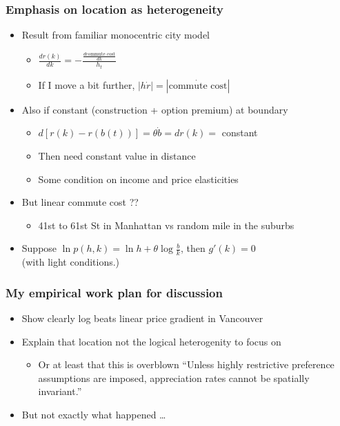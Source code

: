\documentclass{beamer}
\begin{document}
\begin{frame}
	\frametitle{Emphasis on location as heterogeneity}
	\begin{itemize}
		\item Result from familiar monocentric city model 
			\begin{itemize}
				\item $\frac{d r(k)}{dk} = -\frac{\frac{d\text{commute cost}}{dk}}{h_{t}}$
				\item If I move a bit further, $|h\dot{r}| = |\dot{\text{commute cost}}|$
			\end{itemize}
		\item Also if constant (construction + option premium) at boundary
			\begin{itemize}
				\item $d\left[r(k)-r(b(t))\right] = \theta \dot{b} = dr(k)=$ constant
				\item Then need constant value in distance
				\item Some condition on income and price elasticities
			\end{itemize}
		\item But linear commute cost ??
			\begin{itemize}
				\item 41st to 61st St in Manhattan vs random mile in the suburbs
			\end{itemize}
		\item Suppose $\ln p(h,k) = \ln h+\theta\log\frac{b}{k}$, then $g'(k)=0$ \\ (with light conditions.)
	\end{itemize}
\end{frame}

\begin{frame}
	\frametitle{My empirical work plan for discussion}
	\begin{itemize}
		\item Show clearly log beats linear price gradient in Vancouver
		\item Explain that location not the logical heterogenity to focus on
			\begin{itemize}
				\item Or at least that this is overblown ``Unless highly restrictive preference assumptions are imposed, appreciation rates cannot be spatially invariant.''
			\end{itemize}
		\item But not exactly what happened \dots
	\end{itemize}
\end{frame}
\end{document}

